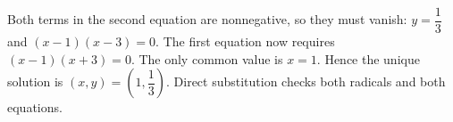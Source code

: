 Both terms in the second equation are nonnegative, so they must vanish: $y = \dfrac{1}{3}$ and $(x-1)(x-3)=0$. The first equation now requires $(x-1)(x+3)=0$. The only common value is $x=1$. Hence the unique solution is $\boxed{(x,y)=(1,\dfrac{1}{3})}$. Direct substitution checks both radicals and both equations.
